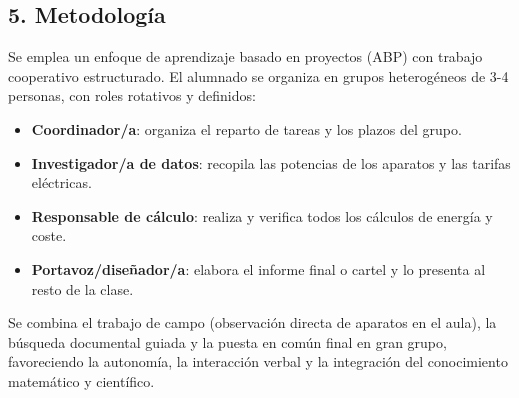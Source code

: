 \documentclass[11pt,a4paper]{article}
\begin{document}
\subsection*{5. Metodología}
Se emplea un enfoque de aprendizaje basado en proyectos (ABP) con trabajo cooperativo estructurado. El alumnado se organiza en grupos heterogéneos de 3-4 personas, con roles rotativos y definidos:
\begin{itemize}
    \item \textbf{Coordinador/a}: organiza el reparto de tareas y los plazos del grupo.
    \item \textbf{Investigador/a de datos}: recopila las potencias de los aparatos y las tarifas eléctricas.
    \item \textbf{Responsable de cálculo}: realiza y verifica todos los cálculos de energía y coste.
    \item \textbf{Portavoz/diseñador/a}: elabora el informe final o cartel y lo presenta al resto de la clase.
\end{itemize}
Se combina el trabajo de campo (observación directa de aparatos en el aula), la búsqueda documental guiada y la puesta en común final en gran grupo, favoreciendo la autonomía, la interacción verbal y la integración del conocimiento matemático y científico.
\end{document}
